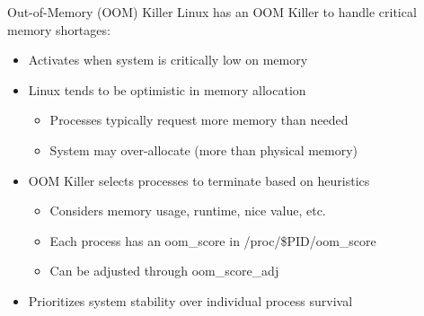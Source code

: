\begin{theorem}{Out-of-Memory (OOM) Killer}
    Linux has an OOM Killer to handle critical memory shortages:
    \begin{itemize}
        \item Activates when system is critically low on memory
        \item Linux tends to be optimistic in memory allocation
            \begin{itemize}
                \item Processes typically request more memory than needed
                \item System may over-allocate (more than physical memory)
            \end{itemize}
        \item OOM Killer selects processes to terminate based on heuristics
            \begin{itemize}
                \item Considers memory usage, runtime, nice value, etc.
                \item Each process has an oom\_score in /proc/\$PID/oom\_score
                \item Can be adjusted through oom\_score\_adj
            \end{itemize}
        \item Prioritizes system stability over individual process survival
    \end{itemize}
\end{theorem}

